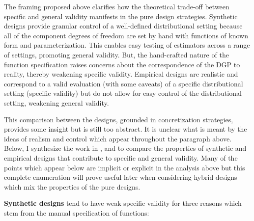 \documentclass[../main.tex]{subfiles}
\begin{document}
\vspace{\baselineskip}
The framing proposed above clarifies how the theoretical trade-off between specific and general validity manifests in the pure design strategies. Synthetic designs provide granular control of a well-defined distributional setting because all of the component degrees of freedom are set by hand with functions of known form and parameterization. This enables easy testing of estimators across a range of settings, promoting general validity. But, the hand-crafted nature of the function specification raises concerns about the correspondence of the DGP to reality, thereby weakening specific validity. Empirical designs are realistic and correspond to a valid evaluation (with some caveats) of a specific distributional setting (specific validity) but do not allow for easy control of the distributional setting, weakening general validity.\par


\vspace{\baselineskip}
This comparison between the designs, grounded in concretization strategies, provides some insight but is still too abstract. It is unclear what is meant by the ideas of realism and control which appear throughout the paragraph above. Below, I synthesize the work in \textcite{Paxton2001MonteImplementation}, \textcite{Huber2013TheScore} and \textcite{Dorie2019Automated1} to compare the properties of synthetic and empirical designs that contribute to specific and general validity. Many of the points which appear below are implicit or explicit in the analysis above but this complete enumeration will prove useful later when considering hybrid designs which mix the properties of the pure designs.\par


\vspace{\baselineskip}
\textbf{Synthetic designs} tend to have weak specific validity for three reasons which stem from the manual specification of functions:\par
\end{document}
